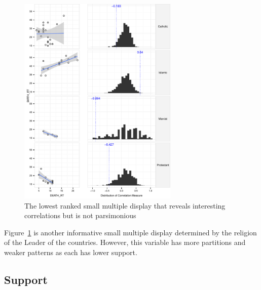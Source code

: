 \begin{figure}
\centering
\includegraphics[width=3in]{images/2_48595929670884-LEADER.pdf}
  \caption{The lowest ranked small multiple display that reveals interesting correlations but is not parsimonious}
 \label{fig:informative_sm_big}
\end{figure}
Figure~\ref{fig:informative_sm_big} is another informative small multiple display determined by the religion of the Leader of the countries. However, this variable has more partitions and weaker patterns as each has lower support. 

\subsection{Support}

